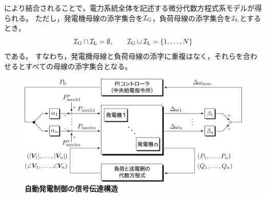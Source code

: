 \documentclass[tombow,dvipdfmx]{corona-a5-1.1}
\begin{document}
により結合されることで，電力系統全体を記述する微分代数方程式系モデルが得られる。
ただし，発電機母線の添字集合を$\mathcal{I}_{\rm G}$，負荷母線の添字集合を$\mathcal{I}_{\rm L}$とするとき，
\[
\mathcal{I}_{\rm G}\cap \mathcal{I}_{\rm L} = \emptyset
,\qquad
\mathcal{I}_{\rm G}\cup \mathcal{I}_{\rm L} = \{1,\ldots, N\}
\]
である。
すなわち，発電機母線と負荷母線の添字に重複はなく，それらを合わせるとすべての母線の添字集合となる。


\begin{figure}[t]
\centering
\includegraphics[width = .75\linewidth]{figs/bcAGC}
\medskip
\caption{\textbf{自動発電制御の信号伝達構造}}
\label{fig:bcAGC}
\medskip
\end{figure}
\end{document}
